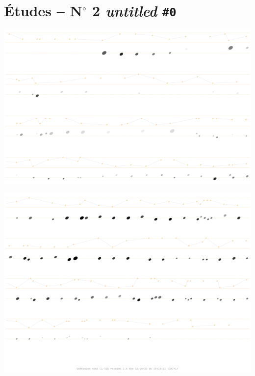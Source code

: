 

\chapter*{\Large \'{E}tudes -- N$^{\circ}$ 2 \textsl{untitled} \texttt{\#0}}
\label{esg}

\vspace{10mm}

\begin{center}
\includegraphics[width=\textwidth]{mp/img/s2-0}
\end{center}

\vspace{-2mm}

\begin{center}
\includegraphics[width=\textwidth]{mp/img/s2-1}
\end{center}
